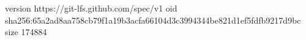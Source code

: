 version https://git-lfs.github.com/spec/v1
oid sha256:65a2ad8aa758cb79f1a19b3acfa66104d3c3994344be821d1ef5fdfb9217d9bc
size 174884
